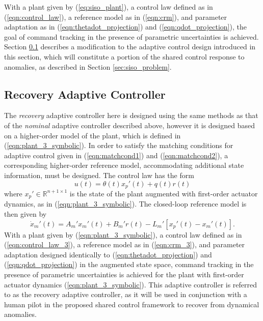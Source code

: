 With a plant given by (\ref{eq:siso_plant}), a control law defined as in (\ref{eqn:control_law}), a reference model as in (\ref{eqn:crm}), and parameter adaptation as in (\ref{eqn:thetadot_projection}) and (\ref{eqn:qdot_projection}), the goal of command tracking in the presence of parametric uncertainties is achieved. Section \ref{subsec:siso_recovery_ac} describes a modification to the adaptive control design introduced in this section, which will constitute a portion of the shared control response to anomalies, as described in Section \ref{sec:siso_problem}.

\subsection{Recovery Adaptive Controller} \label{subsec:siso_recovery_ac}
The \textit{recovery} adaptive controller here is designed using the same methods as that of the \textit{nominal} adaptive controller described above, however it is designed based on a higher-order model of the plant, which is defined in (\ref{eqn:plant_3_symbolic}). In order to satisfy the matching conditions for adaptive control given in (\ref{eqn:matchcond1}) and (\ref{eqn:matchcond2}), a corresponding higher-order reference model, accommodating additional state information, must be designed. The control law has the form
\begin{equation}
	u(t) = \theta(t) x_p'(t) + q(t) r(t)
	\label{eqn:control_law_3}
\end{equation}
where $x_p' \in \mathbb{R}^{n+1 \times 1}$ is the state of the plant augmented with first-order actuator dynamics, as in (\ref{eqn:plant_3_symbolic}). The closed-loop reference model is then given by
\begin{equation}
	\dot{x}_m'(t) = A_m' x_m'(t) + B_m' r(t) - L_m' \left[x_p'(t) - x_m'(t)\right].
	\label{eqn:crm_3}
\end{equation}
With a plant given by (\ref{eqn:plant_3_symbolic}), a control law defined as in (\ref{eqn:control_law_3}), a reference model as in (\ref{eqn:crm_3}), and parameter adaptation designed identically to (\ref{eqn:thetadot_projection}) and (\ref{eqn:qdot_projection}) in the augmented state space, command tracking in the presence of parametric uncertainties is achieved for the plant with first-order actuator dynamics (\ref{eqn:plant_3_symbolic}). This adaptive controller is referred to as the recovery adaptive controller, as it will be used in conjunction with a human pilot in the proposed shared control framework to recover from dynamical anomalies.

